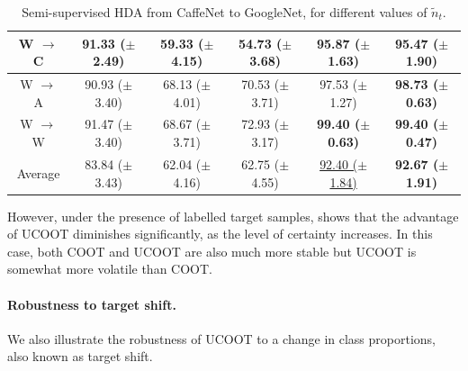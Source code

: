 \begin{table}[t]
\begin{tabular}{c c c c c c}
    W $\to$ C & 91.33 ($\pm$ 2.49) & 59.33 ($\pm$ 4.15) & 54.73 ($\pm$ 3.68) & \textbf{95.87 ($\pm$ 1.63)} & 95.47 ($\pm$ 1.90) \\
    \hline
    W $\to$ A & 90.93 ($\pm$ 3.40) & 68.13 ($\pm$ 4.01) & 70.53 ($\pm$ 3.71) & 97.53 ($\pm$ 1.27) & \textbf{98.73 ($\pm$ 0.63)} \\
    \hline
    W $\to$ W & 91.47 ($\pm$ 3.40) & 68.67 ($\pm$ 3.71) & 72.93 ($\pm$ 3.17) & \textbf{99.40 ($\pm$ 0.63)} & \textbf{99.40 ($\pm$ 0.47)} \\
    \bottomrule
    Average & 83.84 ($\pm$ 3.43) & 62.04 ($\pm$ 4.16) & 62.75 ($\pm$ 4.55) & \underline{92.40 ($\pm$ 1.84)} & \textbf{92.67 ($\pm$ 1.91)} \\
    \bottomrule
  \end{tabular}
  \caption{Semi-supervised HDA from CaffeNet to GoogleNet, for different values of $\tilde{n}_t$.}
  \label{tab:table2}
\end{table}
However, under the presence of
labelled target samples,  shows that the advantage of UCOOT diminishes significantly,
as the level of certainty increases. In this case, both COOT and UCOOT
are also much more stable but UCOOT is somewhat more volatile than COOT.

\paragraph{Robustness to target shift.}
We also illustrate the robustness of UCOOT to a change in class proportions,
also known as target shift.

